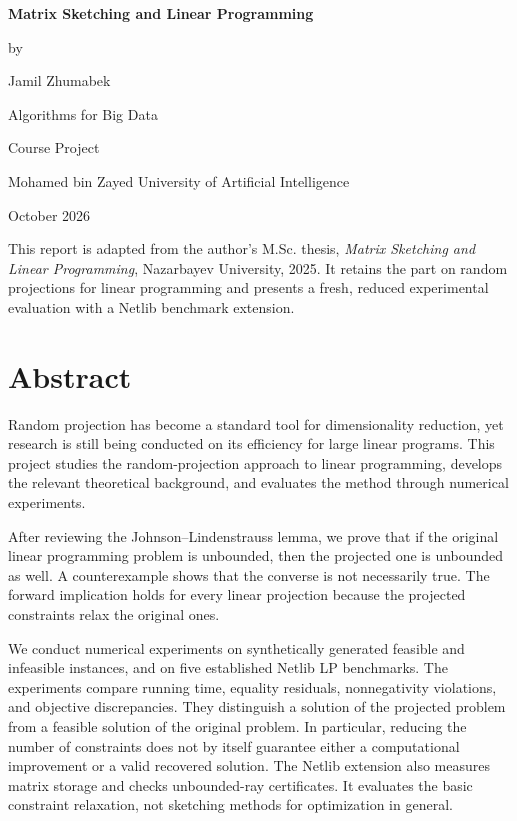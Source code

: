 \documentclass[12pt,letterpaper,oneside]{report}
\theoremstyle{definition}
\begin{document}
\begin{titlepage}
\centering
\vspace*{0.6in}
{\Large\bfseries Matrix Sketching and Linear Programming\par}
\vspace{0.45in}
by\par
{\large Jamil Zhumabek\par}
\vspace{0.8in}
Algorithms for Big Data\par
Course Project\par
\vspace{0.6in}
Mohamed bin Zayed University of Artificial Intelligence\par
\vspace{0.4in}
October 2026\par
\vfill
\begin{minipage}{0.85\textwidth}
\small
This report is adapted from the author's M.Sc. thesis, \emph{Matrix
Sketching and Linear Programming}, Nazarbayev University, 2025. It
retains the part on random projections for linear programming and presents
a fresh, reduced experimental evaluation with a Netlib benchmark extension.
\end{minipage}
\end{titlepage}
\setcounter{page}{2}

\chapter*{Abstract}
Random projection has become a standard tool for dimensionality reduction,
yet research is still being conducted on its efficiency for large linear
programs. This project studies the random-projection approach to linear
programming, develops the relevant theoretical background, and evaluates
the method through numerical experiments.

After reviewing the Johnson--Lindenstrauss lemma, we prove that if the
original linear programming problem is unbounded, then the projected one
is unbounded as well. A counterexample shows that the converse is not
necessarily true. The forward implication holds for every linear
projection because the projected constraints relax the original ones.

We conduct numerical experiments on synthetically generated feasible and
infeasible instances, and on five established Netlib LP benchmarks. The experiments compare running time, equality
residuals, nonnegativity violations, and objective discrepancies. They
distinguish a solution of the projected problem from a feasible solution
of the original problem. In particular, reducing the number of constraints
does not by itself guarantee either a computational improvement or a
valid recovered solution. The Netlib extension also measures matrix storage
and checks unbounded-ray certificates. It evaluates the basic constraint
relaxation, not sketching methods for optimization in general.
\end{document}
